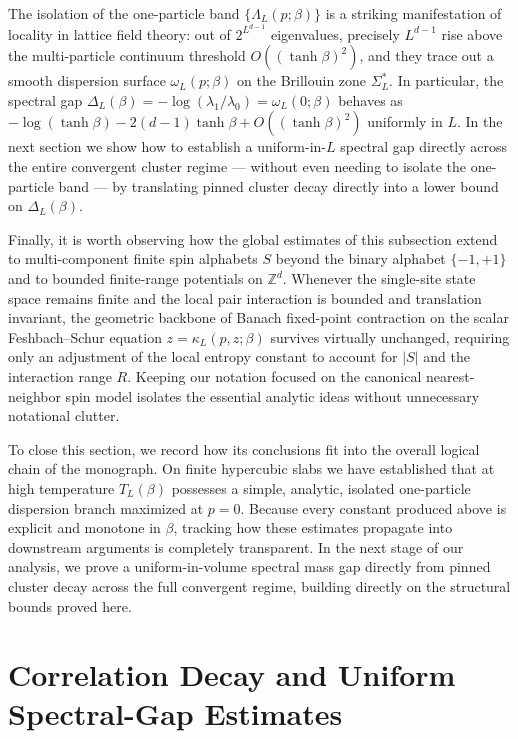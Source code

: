 \documentclass[11pt]{article}
\theoremstyle{definition}
\begin{document}
The isolation of the one-particle band $\{\Lambda_L(p; \beta)\}$ is a striking
manifestation of locality in lattice field theory: out of $2^{L^{d-1}}$ eigenvalues,
precisely $L^{d-1}$ rise above the multi-particle continuum threshold $O((\tanh
\beta)^2)$, and they trace out a smooth dispersion surface $\omega_L(p; \beta)$ on
the Brillouin zone $\Sigma_L^*$. In particular, the spectral gap $\Delta_L(\beta) =
-\log(\lambda_1 / \lambda_0) = \omega_L(0; \beta)$ behaves as $-\log(\tanh \beta) -
2(d-1)\tanh\beta + O((\tanh\beta)^2)$ uniformly in $L$. In the next section we show
how to establish a uniform-in-$L$ spectral gap directly across the entire convergent
cluster regime --- without even needing to isolate the one-particle band --- by
translating pinned cluster decay directly into a lower bound on $\Delta_L(\beta)$.

Finally, it is worth observing how the global estimates of this subsection extend to
multi-component finite spin alphabets $S$ beyond the binary alphabet $\{-1, +1\}$
and to bounded finite-range potentials on $\mathbb{Z}^d$. Whenever the single-site
state space remains finite and the local pair interaction is bounded and translation
invariant, the geometric backbone of Banach fixed-point contraction on the scalar
Feshbach--Schur equation $z = \kappa_L(p, z; \beta)$ survives virtually unchanged,
requiring only an adjustment of the local entropy constant to account for $|S|$ and
the interaction range $R$. Keeping our notation focused on the canonical
nearest-neighbor spin model isolates the essential analytic ideas without
unnecessary notational clutter.

To close this section, we record how its conclusions fit into the overall logical
chain of the monograph. On finite hypercubic slabs we have established that at high
temperature $T_L(\beta)$ possesses a simple, analytic, isolated one-particle
dispersion branch maximized at $p = 0$. Because every constant produced above is
explicit and monotone in $\beta$, tracking how these estimates propagate into
downstream arguments is completely transparent. In the next stage of our analysis,
we prove a uniform-in-volume spectral mass gap directly from pinned cluster decay
across the full convergent regime, building directly on the structural bounds proved
here.

\section{Correlation Decay and Uniform Spectral-Gap Estimates}
\label{sec:s08}
\end{document}
